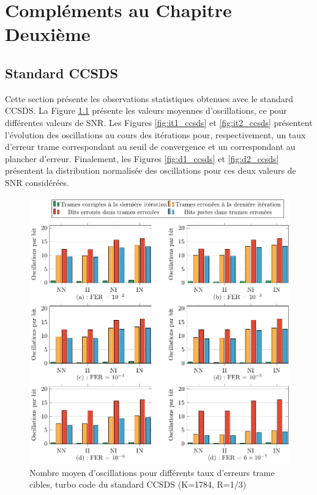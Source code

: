 

\chapter{Compléments au Chapitre Deuxième}
\section{Standard CCSDS}\label{sec:annCCSDS}
Cette section présente les observations statistiques obtenues avec le standard CCSDS. La Figure \ref{fig:m_ccsds} présente 
les valeurs moyennes d'oscillations, ce pour différentes valeurs de SNR. Les Figures \ref{fig:it1_ccsds} et \ref{fig:it2_ccsds}
présentent l'évolution des oscillations au cours des itérations pour, respectivement, un taux d'erreur trame correspondant 
au seuil de convergence et un correspondant au plancher d'erreur. Finalement, les Figures \ref{fig:d1_ccsds} et \ref{fig:d2_ccsds} 
présentent la distribution normalisée des oscillations pour ces deux valeurs de SNR considérées.
\begin{figure}[tb]
	\begin{center}
	\includegraphics[width=.9\textwidth]{main/ch2_fig/tikz/m_ccsds.pdf}
	\caption{Nombre moyen d'oscillations pour différents taux d'erreurs trame cibles, turbo code du standard CCSDS (K=1784, R=1/3) \label{fig:m_ccsds}}
	\end{center}
\end{figure}

